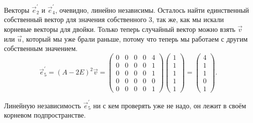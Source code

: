 \begin{solution}
	Векторы $\vec{e}^\prime_2$ и $\vec{e}^\prime_4$, очевидно, линейно независимы. Осталось найти единственный собственный вектор для значения собственного $3$, так же, как мы искали корневые векторы для двойки. Только теперь случайный вектор можно взять $\vec{v}$ или $\vec{u}$, который мы уже брали раньше, потому что теперь мы работаем с другим собственным значением.
	\[
		\vec{e}^\prime_5 = (A - 2E)^2\vec{v} =
		\begin{pmatrix}
			0 & 0 & 0 & 0 & 4\\
			0 & 0 & 0 & 0 & 1\\
			0 & 0 & 0 & 0 & 1\\
			0 & 0 & 0 & 0 & 0\\
			0 & 0 & 0 & 0 & 1
		\end{pmatrix}
		\begin{pmatrix}
			1\\
			1\\
			1\\
			1\\
			1
		\end{pmatrix} =
		\begin{pmatrix}
			4\\
			1\\
			1\\
			0\\
			1
		\end{pmatrix}.
	\]

	Линейную независимость $\vec{e}^\prime_5$ ни с кем проверять уже не надо, он лежит в своём корневом подпространстве.
\end{solution}

